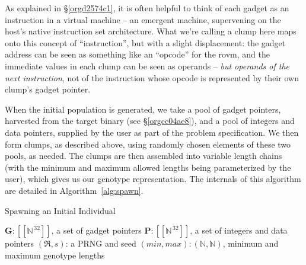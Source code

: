 \documentclass[12pt,glossary]{dalthesis}
\begin{document}
As explained in \S \ref{orgd2574c1}, it is often helpful to think of
each gadget as an instruction in a virtual machine -- an emergent machine,
supervening on the host's native instruction set architecture. What we're
calling a clump here maps onto this concept of ``instruction'', but with a
slight displacement: the gadget address can be seen as something
like an ``opcode'' for the \gls{rovm}, and the immediate values in each clump
can be seen as operands -- \emph{but operands of the next instruction}, not of
the instruction whose opcode is represented by their own clump's gadget
pointer.

When the initial population is generated, we take a pool of gadget pointers, 
harvested from the target binary (see \S \ref{orgcc04ae8}), and a
pool of integers and data pointers, supplied by the user as part of the problem
specification. We then form clumps, as described above, using randomly chosen
elements of these two pools, as needed. The clumps are then assembled into 
variable length chains (with the minimum and maximum allowed lengths being
parameterized by the user), which gives us our genotype representation. The
internals of this algorithm are detailed in Algorithm~\ref{alg:spawn}.

\begin{algorithm}
\caption{Spawning an Initial Individual}
\label{alg:spawn}
\begin{algorithmic}[1]
\REQUIRE $\mathbf{G}: [\![\mathbb{N}^{\,32}]\!]$, a set of gadget pointers
\REQUIRE $\mathbf{P}: [\![\mathbb{N}^{\,32}]\!]$, a set of integers and data pointers
\REQUIRE $(\mathfrak{R}, s)$: a PRNG and seed
\REQUIRE $(min, max): (\mathbb{N}, \mathbb{N})$, minimum and maximum genotype lengths
 
    \ENDFOR
\ENDFOR
\RETURN {$\Gamma$}
\end{algorithmic}
\end{algorithm}
\end{document}
